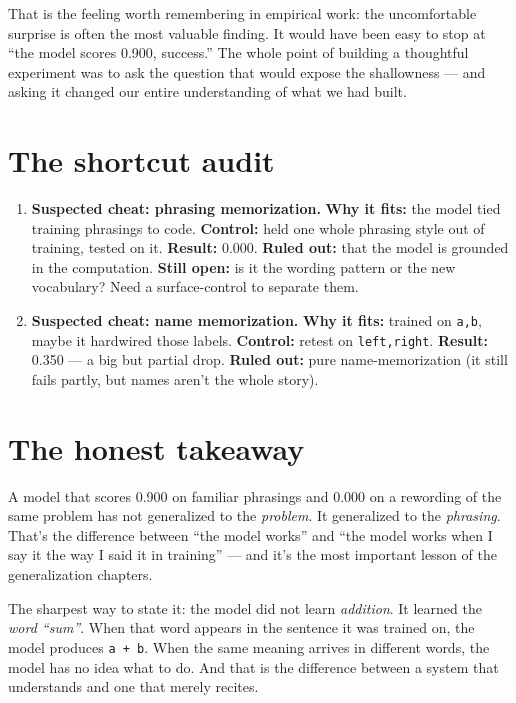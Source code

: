 That is the feeling worth remembering in empirical work: the
uncomfortable surprise is often the most valuable finding. It would have
been easy to stop at ``the model scores 0.900, success.'' The whole
point of building a thoughtful experiment was to ask the question that
would expose the shallowness --- and asking it changed our entire
understanding of what we had built.

\section{The shortcut audit}\label{the-shortcut-audit}

\begin{enumerate}
\def\labelenumi{\arabic{enumi}.}
\item
  \textbf{Suspected cheat: phrasing memorization.} \textbf{Why it fits:}
  the model tied training phrasings to code. \textbf{Control:} held one
  whole phrasing style out of training, tested on it. \textbf{Result:}
  0.000. \textbf{Ruled out:} that the model is grounded in the
  computation. \textbf{Still open:} is it the wording pattern or the new
  vocabulary? Need a surface-control to separate them.
\item
  \textbf{Suspected cheat: name memorization.} \textbf{Why it fits:}
  trained on \texttt{a,b}, maybe it hardwired those labels.
  \textbf{Control:} retest on \texttt{left,right}. \textbf{Result:}
  0.350 --- a big but partial drop. \textbf{Ruled out:} pure
  name-memorization (it still fails partly, but names aren't the whole
  story).
\end{enumerate}

\section{The honest takeaway}\label{the-honest-takeaway}

A model that scores 0.900 on familiar phrasings and 0.000 on a rewording
of the same problem has not generalized to the \emph{problem}. It
generalized to the \emph{phrasing}. That's the difference between ``the
model works'' and ``the model works when I say it the way I said it in
training'' --- and it's the most important lesson of the generalization
chapters.

The sharpest way to state it: the model did not learn \emph{addition}.
It learned the \emph{word ``sum''}. When that word appears in the
sentence it was trained on, the model produces \texttt{a\ +\ b}. When
the same meaning arrives in different words, the model has no idea what
to do. And that is the difference between a system that understands and
one that merely recites.
